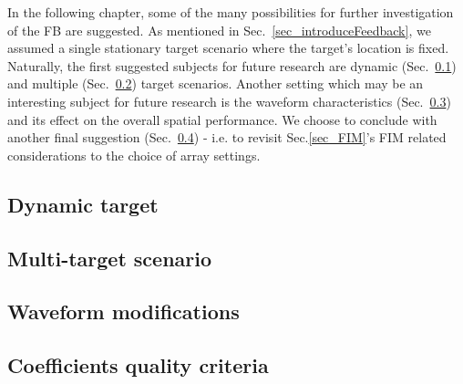 In the following chapter, some of the many possibilities for further investigation of the FB are suggested.
As mentioned in Sec.~\ref{sec_introduceFeedback}, we assumed a single stationary target scenario where the target's location is fixed.
Naturally, the first suggested subjects for future research are dynamic (Sec.~\ref{sec_future_dynamic}) and multiple (Sec.~\ref{sec_future_multiTarget}) target scenarios.
Another setting which may be an interesting subject for future research is the waveform characteristics (Sec.~\ref{sec_future_wavfrom}) and its effect on the overall spatial performance.
We choose to conclude with another final suggestion (Sec.~\ref{sec_future_coef}) - i.e. to revisit Sec.\ref{sec_FIM}'s FIM related considerations to the choice of array settings. 
\subsection{Dynamic target}
\label{sec_future_dynamic}

\subsection{Multi-target scenario}
\label{sec_future_multiTarget}

\subsection{Waveform modifications}
\label{sec_future_wavfrom}

\subsection{Coefficients quality criteria}
\label{sec_future_coef}

% 